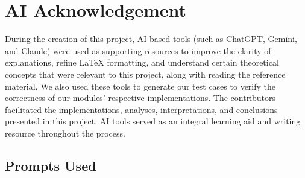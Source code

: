 
\section{AI Acknowledgement}
\label{app:ai}

During the creation of this project, AI-based tools (such as ChatGPT, Gemini, and Claude) were used as supporting resources to improve the clarity of explanations, refine LaTeX formatting, and understand certain theoretical concepts that were relevant to this project, along with reading the reference material. We also used these tools to generate our test cases to verify the correctness of our modules' respective implementations.
The contributors facilitated the implementations, analyses, interpretations, and conclusions presented in this project. AI tools served as an integral learning aid and writing resource throughout the process.

\subsection{Prompts Used}




